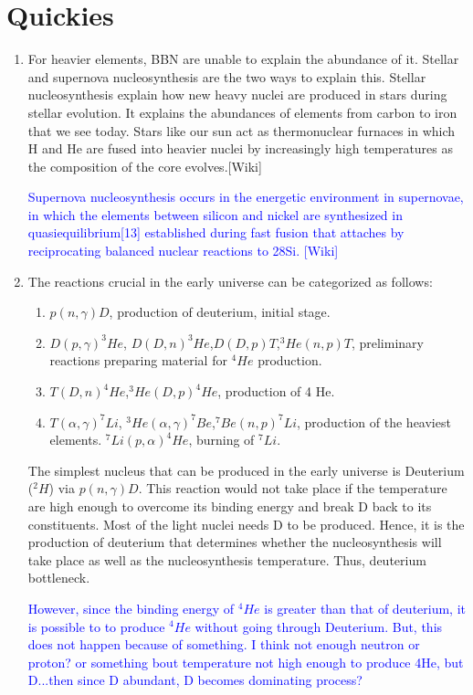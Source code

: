 \section{Quickies}
\begin{enumerate}[label=\alph*)]
\item For heavier elements, BBN are unable to explain the abundance of it. Stellar and supernova nucleosynthesis are the two ways to explain this. Stellar nucleosynthesis explain how new heavy nuclei are produced in stars during stellar evolution. It explains the abundances of elements from carbon to iron that we see today. Stars like our sun act as thermonuclear furnaces in which H and He are fused into heavier nuclei by increasingly high temperatures as the composition of the core evolves.[Wiki] 

\textcolor{blue}{Supernova nucleosynthesis occurs in the energetic environment in supernovae, in which the elements between silicon and nickel are synthesized in quasiequilibrium[13] established during fast fusion that attaches by reciprocating balanced nuclear reactions to 28Si. [Wiki]}

\item The reactions crucial in the early universe can be categorized as follows:
\begin{enumerate}[label=\roman*)]
\item $p(n, \gamma)D$, production of deuterium, initial stage.
\item $D(p,\gamma) ^3 He$, $D(D, n) ^3 He$,$ D(D, p)T$,$ ^3 He(n, p)T$, preliminary reactions preparing material for $^4 He$ production.
\item $T(D, n) ^4 He$,$ ^3 He(D, p) ^4 He$, production of 4 He.
\item $T(\alpha, \gamma) ^7 Li$, $^3 He(\alpha, \gamma) ^7 Be$,$^ 7 Be(n, p) ^7Li$, production of the heaviest elements. $^7 Li(p, \alpha) ^4 He$, burning of $^7 Li$.
\end{enumerate}

The simplest nucleus that can be produced in the early universe is Deuterium ($^2 H$) via $p(n, \gamma)D$. This reaction would not take place if the temperature are high enough to overcome its binding energy and break D back to its constituents. Most of the light nuclei needs D to be produced. Hence, it is the production of deuterium that determines whether the nucleosynthesis will take place as well as the nucleosynthesis temperature. Thus, deuterium bottleneck.

\textcolor{blue}{However, since the binding energy of $^4 He$ is greater than that of deuterium, it is possible to to produce $^4 He$ without going through Deuterium. But, this does not happen because of something. I think not enough neutron or proton? or something bout temperature not high enough to produce 4He, but D...then since D abundant, D becomes dominating process?}

\end{enumerate}